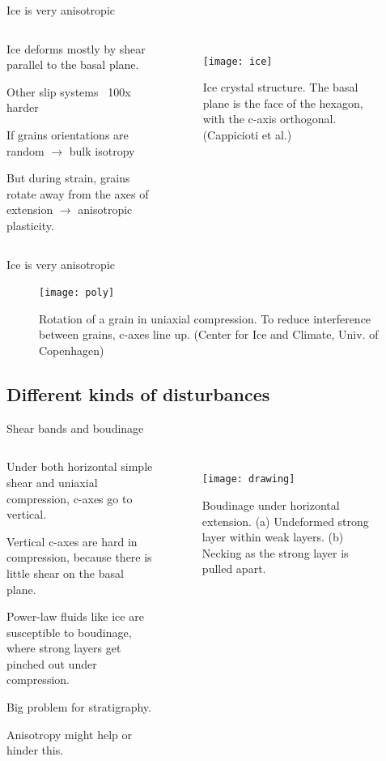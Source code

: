 \documentclass{beamer}
\begin{document}
\begin{frame}{Ice is very anisotropic}
  \begin{columns}[T]
  \begin{itemize}
        \small{
  \item Ice deforms mostly by shear parallel to the basal plane.
  \item Other slip systems ~100x harder
  \item If grains orientations are random $\rightarrow$ bulk isotropy
    \item But during strain, grains rotate away from the axes of extension $\rightarrow$ anisotropic plasticity.
  }
  \end{itemize}
  \begin{figure}
     \texttt{[image: ice]}
     \caption{Ice crystal structure. The basal plane is the face of the hexagon, with the c-axis orthogonal. (Cappicioti et al.)}
  \end{figure}


  \end{columns}
\end{frame}

\begin{frame}{Ice is very anisotropic}
\begin{figure}
     \texttt{[image: poly]}
     \caption{Rotation of a grain in uniaxial compression. To reduce interference between grains, c-axes line up. (Center for Ice and Climate, Univ. of Copenhagen)}
  \end{figure}
  \end{frame}

\subsection{Different kinds of disturbances}
\begin{frame}{Shear bands and boudinage}
   \begin{columns}[T]
   \begin{itemize}
      \small{
      \item Under both horizontal simple shear and uniaxial compression, c-axes go to vertical.
      \item Vertical c-axes are hard in compression, because there is little shear on the basal plane.
      \item Power-law fluids like ice are susceptible to boudinage, where strong layers get pinched out under compression.
      \item Big problem for stratigraphy.
      \item Anisotropy might help or hinder this.
   }
   \end{itemize}
   \begin{figure}
      \texttt{[image: drawing]}
      \caption{Boudinage under horizontal extension. (a) Undeformed strong layer within weak layers. (b) Necking as the strong layer is pulled apart.}
   \end{figure}
 
\end{columns}
\end{frame}
\end{document}
